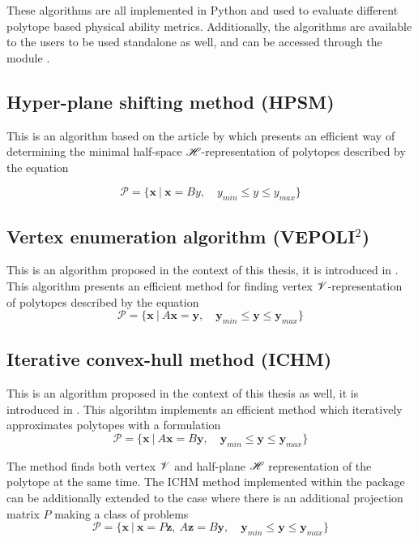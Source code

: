 These algorithms are all implemented in Python and used to evaluate different polytope based physical ability metrics. Additionally, the algorithms are available to the users to be used standalone as well, and can be accessed through the module .

\subsection{Hyper-plane shifting method (HPSM)}

This is an algorithm based on the article by \citet{hyper_psm} which presents an efficient way of determining the minimal half-space $\mathscr{H}$-representation of polytopes described by the equation 

\begin{equation}\label{eq:hpsm}
\mathcal{P} = \{ \bm{x} ~|~ \bm{x} = By, \quad y_{min}\leq y \leq y_{max} \}
\end{equation}

\subsection{Vertex enumeration algorithm (VEPOLI$^2$)}

This is an algorithm proposed in the context of this thesis, it is introduced in . This algorithm presents an efficient method for finding vertex $\mathscr{V}$-representation of polytopes described by the equation
\begin{equation}\label{eq:vertex_vepoli2}
\mathcal{P} = \{ \bm{x} ~|~ A\bm{x} = \bm{y}, \quad \bm{y}_{min}\leq \bm{y} \leq \bm{y}_{max} \}
\end{equation}


\subsection{Iterative convex-hull method (ICHM)}

This is an algorithm proposed in the context of this thesis as well, it is introduced in . This algorihtm implements an efficient method which iteratively approximates polytopes with a formulation
\begin{equation}\label{eq:ichm}
\mathcal{P} = \{ \bm{x} ~|~ A\bm{x} = B\bm{y}, \quad \bm{y}_{min}\leq \bm{y} \leq \bm{y}_{max} \}
\end{equation}

The method finds both vertex $\mathscr{V}$ and half-plane $\mathscr{H}$ representation of the polytope at the same time. The ICHM method implemented within the  package can be additionally extended to the case where there is an additional projection matrix $P$ making a class of problems
\begin{equation}\label{eq:ichm_full}
\mathcal{P} = \{ \bm{x} ~|~ \bm{x}= P\bm{z}, ~A\bm{z} = B\bm{y}, \quad \bm{y}_{min}\leq \bm{y} \leq \bm{y}_{max} \}
\end{equation}



